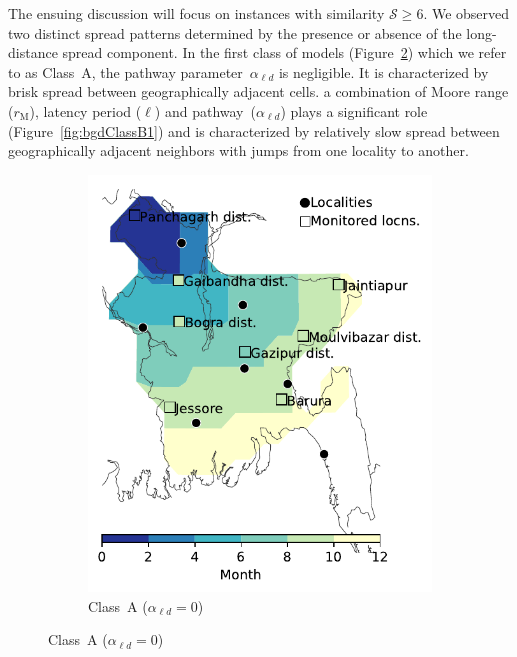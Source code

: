 \documentclass[11pt]{article}
\newcommand{\similarity}{\mathcal{S}}
\newcommand{\asd}{\alpha_s}
\newcommand{\afm}{\alpha_{\ell}}
\newcommand{\ald}{\alpha_{\ell d}}
\newcommand{\mooreRange}{r_\mathrm{M}}
\theoremstyle{definition}
\begin{document}
The ensuing discussion will focus on instances with similarity
$\similarity\ge6$. We observed two distinct spread patterns determined by
the presence or absence of the long-distance spread component. In the first
class of models (Figure~\ref{fig:bgdClassA}) which we refer to as Class~A,
the pathway parameter~$\ald$ is negligible. It is characterized by brisk
spread between geographically adjacent cells.  %
a combination of Moore range ($\mooreRange$), latency period ($\ell$) and
pathway~($\ald$) plays a significant role (Figure~\ref{fig:bgdClassB1}) and
is characterized by relatively slow spread between geographically adjacent
neighbors with jumps from one locality to another.
\begin{figure}[!ht]
    \centering
\begin{subfigure}[b]{.47\textwidth}
    \includegraphics[width=\textwidth]{../cellular_automata/results/contour/BGD_model-A.pdf}
    \caption{Class~A ($\ald=0$) \label{fig:bgdClassA}}

\end{subfigure}
\end{figure}
\end{document}
